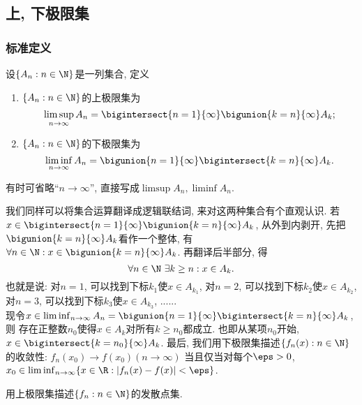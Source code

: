 \subsection{上, 下极限集}
\subsubsection{标准定义}
设$\{A_n: n \in \N\}$是一列集合, 定义
\begin{enumerate}
    \item $\{A_n: n \in \N\}$的上极限集为
    $$\limsup_{n\to \infty}A_n = \bigintersect{n=1}{\infty}\bigunion{k=n}{\infty}A_k;$$
    \item $\{A_n: n \in \N\}$的下极限集为
    $$\liminf_{n\to \infty}A_n = \bigunion{n=1}{\infty}\bigintersect{k=n}{\infty}A_k.$$
\end{enumerate}
\begin{remark}
    有时可省略“$n\to \infty$”, 直接写成$\limsup A_n, \liminf A_n$.
\end{remark}
我们同样可以将集合运算翻译成逻辑联结词, 来对这两种集合有个直观认识. 
若$x \in \bigintersect{n=1}{\infty}\bigunion{k=n}{\infty}A_k$, 从外到内剥开, 先把$\bigunion{k=n}{\infty}A_k$看作一个整体, 有$\forall n \in \N: x \in \bigunion{k=n}{\infty}A_k$. 再翻译后半部分, 得$$\forall n \in \N~\exists k \geq n: x \in A_k.$$
也就是说: 对$n=1$, 可以找到下标$k_1$使$x \in A_{k_1}$, 对$n=2$, 可以找到下标$k_2$使$x \in A_{k_2}$,
对$n=3$, 可以找到下标$k_3$使$x \in A_{k_3}$, ...... \\
现令$x \in \liminf_{n\to \infty}A_n = \bigunion{n=1}{\infty}\bigintersect{k=n}{\infty}A_k$, 则
存在正整数$n_0$使得$x \in A_k$对所有$k\geq n_0$都成立. 也即从某项$n_0$开始, $x \in \bigintersect{k=n_0}{\infty}A_k$. 最后, 我们用下极限集描述$\{f_n(x): n \in \N\}$的收敛性:
$f_n(x_0) \to f(x_0) (n \to \infty)$ 当且仅当对每个$\eps>0$, 
$x_0 \in \liminf_{n\to \infty}\{x \in \R: |f_n(x)-f(x)| < \eps\}$.
\begin{exercise}
    用上极限集描述$\{f_n:n \in \N\}$的发散点集.
\end{exercise}

